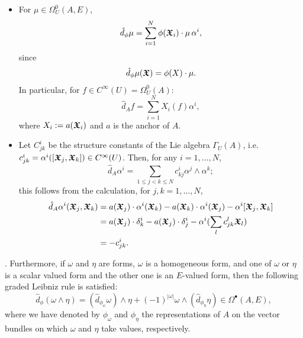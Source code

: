 \begin{remark}
\begin{itemize}
    \item For $\mu \in \Omega_U^0(A, E)$,
    \begin{equation}\label{equationDifferentialESection0FormLocalFrame}
        \hat d_\phi \mu = \sum_{i = 1}^N \phi(\sectoid X_i)\cdot \mu \, \alpha^i,
    \end{equation}
    since
    \begin{align*}
        \hat d_\phi \mu(\sectoid X) = \phi(X)\cdot \mu.
    \end{align*}
    In particular, for $f \in C^\infty(U) = \Omega_U^0(A)$:
    \begin{equation}\label{equationDifferentialOfAFunctionInLocalFrame}
        \hat d_A f = \sum_{i = 1}^N X_i(f) \alpha^i,
    \end{equation}
    where $X_i := a(\bm{\mathfrak{X}}_i)$ and $a$ is the anchor of $A$.
    
    \item Let $C^i_{jk}$ be the structure constants of the Lie algebra $\Gamma_U(A)$, i.e. $c^i_{jk} = \alpha^i([\bm{\mathfrak{X}}_j, \bm{\mathfrak{X}}_k]) \in C^\infty(U)$. Then, for any $i = 1, \dots, N$,
    \begin{equation}\label{equationDifferentialOfDual1FormsLocalFrame}
        \hat d_A \alpha^i = \sum_{1 \leq j < k \leq N} c^i_{k j} \alpha^j \wedge \alpha^k;
    \end{equation}
    this follows from the calculation, for $j, k = 1, \dots, N$,
    \begin{align*}
        \hat d_A \alpha^i(\bm{\mathfrak{X}}_j, \bm{\mathfrak{X}}_k) 
            &= a(\bm{\mathfrak{X}}_j)\cdot \alpha^i(\bm{\mathfrak{X}}_k) - a(\bm{\mathfrak{X}}_k)\cdot \alpha^i(\bm{\mathfrak{X}}_j) - \alpha^i[\bm{\mathfrak{X}}_j, \bm{\mathfrak{X}}_k]\\
            &= a(\bm{\mathfrak{X}}_j)\cdot \delta^i_k - a(\bm{\mathfrak{X}}_j)\cdot \delta^i_j - \alpha^i(\sum_l c^l_{jk} \bm{\mathfrak{X}}_l)\\
            &= -c^i_{jk}.
    \end{align*}
    
    \end{itemize}
\end{remark}

\begin{theorem}\label{theoFormsAreDiffGModule}
 . Furthermore, if $\omega$ and $\eta$ are forms, $\omega$ is a homogeneous form, and one of $\omega$ or $\eta$ is a scalar valued form and the other one is an $E$-valued form, then the following graded Leibniz rule is satisfied:
 \begin{equation}\label{equationGradedLeibnizScalarAndEValuedVectorForms}
    \hat d_{\phi} (\omega \wedge \eta) = (\hat d_{\phi_\omega} \omega)\wedge\eta + (-1)^{|\omega|} \omega \wedge (\hat d_{\phi_\eta}\eta) \in \Omega^\bullet(A, E),
 \end{equation}
 where we have denoted by $\phi_{\omega}$ and $\phi_{\eta}$ the representations of $A$ on the vector bundles on which $\omega$ and $\eta$ take values, respectively.
\end{theorem}

